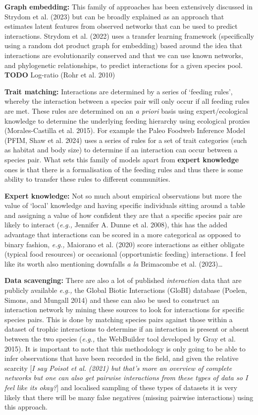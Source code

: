 \documentclass[
  letterpaper,
  DIV=11,
  numbers=noendperiod]{scrartcl}
\begin{document}
\textbf{Graph embedding:} This family of approaches has been extensively
discussed in Strydom et al. (2023) but can be broadly explained as an
approach that estimates latent features from observed networks that can
be used to predict interactions. Strydom et al. (2022) uses a transfer
learning framework (specifically using a random dot product graph for
embedding) based around the idea that interactions are evolutionarily
conserved and that we can use known networks, and phylogenetic
relationships, to predict interactions for a given species pool.
\textbf{TODO} Log-ratio (Rohr et al. 2010)

\textbf{Trait matching:} Interactions are determined by a series of
`feeding rules', whereby the interaction between a species pair will
only occur if all feeding rules are met. These rules are determined on
an \emph{a priori} basis using expert/ecological knowledge to determine
the underlying feeding hierarchy using ecological proxies
(Morales-Castilla et al. 2015). For example the Paleo Foodweb Inference
Model (PFIM, Shaw et al. 2024) uses a series of rules for a set of trait
categories (such as habitat and body size) to determine if an
interaction can occur between a species pair. What sets this family of
models apart from \textbf{expert knowledge} ones is that there is a
formalisation of the feeding rules and thus there is some ability to
transfer these rules to different communities.

\textbf{Expert knowledge:} Not so much about empirical observations but
more the value of `local' knowledge and having specific individuals
sitting around a table and assigning a value of how confident they are
that a specific species pair are likely to interact (\emph{e.g.,}
Jennifer A. Dunne et al. 2008), this has the added advantage that
interactions can be scored in a more categorical as opposed to binary
fashion, \emph{e.g.,} Maiorano et al. (2020) score interactions as
either obligate (typical food resources) or occasional (opportunistic
feeding) interactions. I feel like its worth also mentioning downfalls
\emph{a la} Brimacombe et al. (2023)\ldots{}

\textbf{Data scavenging:} There are also a lot of published
\emph{interaction} data that are publicly available \emph{e.g.,} the
Global Biotic Interactions (GloBI) database (Poelen, Simons, and Mungall
2014) and these can also be used to construct an interaction network by
mining these sources to look for interactions for specific species
pairs. This is done by matching species pairs against those within a
dataset of trophic interactions to determine if an interaction is
present or absent between the two species (\emph{e.g.,} the WebBuilder
tool developed by Gray et al. 2015). It is important to note that this
methodology is only going to be able to infer observations that have
been recorded in the field, and given the relative scarcity {[}\emph{I
say Poisot et al. (2021) but that's more an overview of complete
networks but one can also get pairwise interactions from these types of
data so I feel like its okay?}{]} and localised sampling of these types
of datasets it is very likely that there will be many false negatives
(missing pairwise interactions) using this approach.
\end{document}
